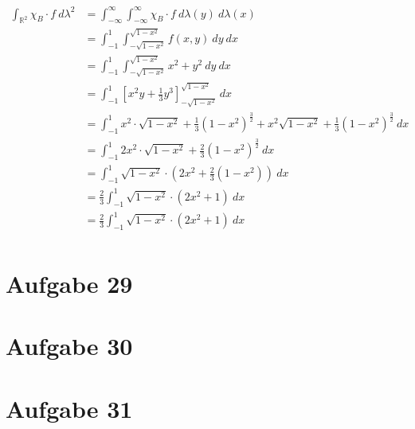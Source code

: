 \documentclass[10pt,a4paper]{article}
\begin{document}
\begin{align*}
  \int_{\mathbb{R}^{2}} \chi_{B} \cdot f\ d\lambda^{2} & = \int_{-\infty}^{\infty} \int_{-\infty}^{\infty} \chi_{B} \cdot f\ d\lambda(y)\ d\lambda(x)\\
  & = \int_{-1}^{1} \int_{-\sqrt{1 - x^{2}}}^{\sqrt{1 - x^{2}}} f(x, y)\ dy\ dx\\
  & = \int_{-1}^{1} \int_{-\sqrt{1 - x^{2}}}^{\sqrt{1 - x^{2}}} x^{2} + y^{2}\ dy\ dx\\
  & = \int_{-1}^{1} \left[ x^{2}y + \frac{1}{3}y^{3} \right]_{-\sqrt{1 - x^{2}}}^{\sqrt{1 - x^{2}}}\ dx\\
  & = \int_{-1}^{1} x^{2} \cdot \sqrt{1 - x^{2}} + \frac{1}{3}(1 - x^{2})^{\frac{3}{2}} + x^{2}\sqrt{1 - x^{2}} + \frac{1}{3}(1 - x^{2})^{\frac{3}{2}}\ dx\\
  & = \int_{-1}^{1} 2x^{2} \cdot \sqrt{1 - x^{2}} + \frac{2}{3}(1 - x^{2})^{\frac{3}{2}}\ dx\\
  & = \int_{-1}^{1} \sqrt{1 - x^{2}} \cdot (2x^{2} + \frac{2}{3}(1 - x^{2}))\ dx\\
  & = \frac{2}{3} \int_{-1}^{1} \sqrt{1 - x^{2}} \cdot (2x^{2} + 1)\ dx\\
  & = \frac{2}{3} \int_{-1}^{1} \sqrt{1 - x^{2}} \cdot (2x^{2} + 1)\ dx\\
\end{align*}

\section{Aufgabe 29}

\section{Aufgabe 30}

\section{Aufgabe 31}
\end{document}
